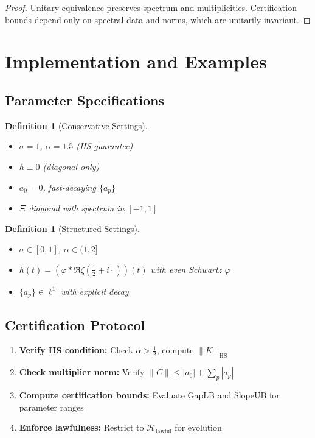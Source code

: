 \documentclass[10pt]{article}
\newtheorem{definition}[theorem]{Definition}
\newcommand{\HH}{\mathcal{H}}
\begin{document}
\begin{proof}
Unitary equivalence preserves spectrum and multiplicities. Certification bounds depend only on spectral data and norms, which are unitarily invariant.
\end{proof}

\section{Implementation and Examples}

\subsection{Parameter Specifications}

\begin{definition}[Conservative Settings]
\begin{itemize}
    \item $\sigma = 1$, $\alpha = 1.5$ (HS guarantee)
    \item $h \equiv 0$ (diagonal only)
    \item $a_0 = 0$, fast-decaying $\{a_p\}$
    \item $\Xi$ diagonal with spectrum in $[-1,1]$
\end{itemize}
\end{definition}

\begin{definition}[Structured Settings] 
\begin{itemize}
    \item $\sigma \in [0,1]$, $\alpha \in (1,2]$
    \item $h(t) = (\varphi * \Re\zeta(\frac12 + i\cdot))(t)$ with even Schwartz $\varphi$
    \item $\{a_p\} \in \ell^1$ with explicit decay
\end{itemize}
\end{definition}

\subsection{Certification Protocol}

\begin{enumerate}
    \item \textbf{Verify HS condition:} Check $\alpha > \frac12$, compute $\|K\|_{\text{HS}}$
    \item \textbf{Check multiplier norm:} Verify $\|C\| \leq |a_0| + \sum_p |a_p|$  
    \item \textbf{Compute certification bounds:} Evaluate GapLB and SlopeUB for parameter ranges
    \item \textbf{Enforce lawfulness:} Restrict to $\HH_{\text{lawful}}$ for evolution
\end{enumerate}
\end{document}
